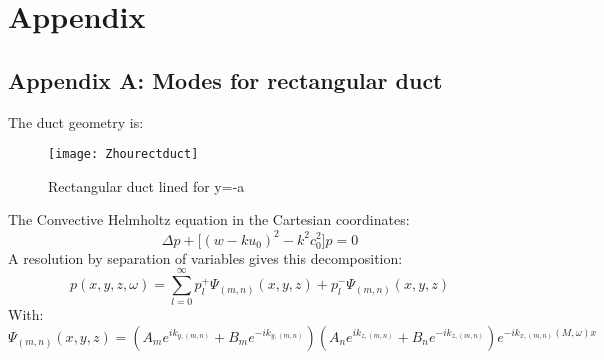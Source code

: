 \section{Appendix}\label{sec:Annexes}
\subsection*{Appendix A: Modes for rectangular duct}\label{sec:EigenvalueRect}
The duct geometry is:
\begin{figure}[H] \centering
    \texttt{[image: Zhourectduct]}
    \caption{Rectangular duct lined for y=-a}
\end{figure}
The Convective Helmholtz equation in the Cartesian coordinates:
\begin{equation}
    \Delta p +\Big[(w-ku_0)^2-k^2c_0^2\Big]p=0
\end{equation}
A resolution by separation of variables gives this decomposition:
\begin{equation}
    p(x,y,z,\omega)=\sum_{l=0}^\infty p_l^+ \Psi_{(m,n)}(x,y,z)+p_l^- \Psi_{(m,n)}(x,y,z)
\end{equation}
With:
\begin{equation}
    \Psi_{(m,n)}(x,y,z)=(A_me^{ik_{y,(m,n)}}+B_me^{-ik_{y,(m,n)}})(A_ne^{ik_{z,(m,n)}}+B_ne^{-ik_{z,(m,n)}})e^{-ik_{x,(m,n)}(M,\omega)x}
\end{equation}

